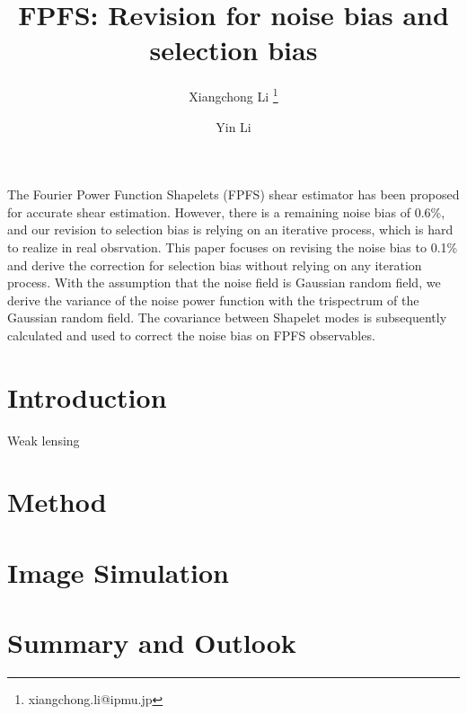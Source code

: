 \documentclass{aa}
\begin{document}
\title{FPFS: Revision for noise bias and selection bias}
\author{Xiangchong Li   \thanks{xiangchong.li@ipmu.jp}
\and Yin Li }

\abstract
{}
{
The Fourier Power Function Shapelets (FPFS) shear estimator has been proposed
for accurate shear estimation. However, there is a remaining noise bias of
0.6\%, and our revision to selection bias is relying on an iterative process,
which is hard to realize in real obsrvation. This paper focuses on revising the
noise bias to 0.1\% and derive the correction for selection bias without
relying on any iteration process.
}
{
With the assumption that the noise field is Gaussian random field, we derive
the variance of the noise power function with the trispectrum of the Gaussian
random field. The covariance between Shapelet modes is subsequently
calculated and used to correct the noise bias on FPFS observables.
}
{

}
{

}
\maketitle

\section{Introduction}
\label{sec:Intro}
Weak lensing

\section{Method}
\label{sec:Method}


\section{Image Simulation}
\label{sec:sim}


\section{Summary and Outlook}
\label{sec:Summary}

\begin{acknowledgements}

\end{acknowledgements}



\end{document}
